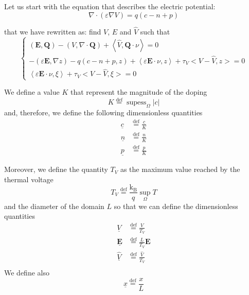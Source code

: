\documentclass[a4paper,12pt, draft]{article}
\newcommand{\Def}{\stackrel{\mathrm{def}}{=}}
\newcommand{\efield}{\ensuremath{\mathbf{E}}}
\newcommand{\qtest}{\ensuremath{\mathbf{Q}}}
\newcommand{\ttest}{\ensuremath{\xi}}
\newcommand{\cmagn}{\ensuremath{K}}
\newcommand{\adim}[1]{\ensuremath{\underline{#1}}}
\begin{document}
Let us start with the equation that describes the electric potential:
\begin{equation*}
 \nabla\cdot\left( \varepsilon \nabla V\right) = q \left( c - n + p \right)
\end{equation*}

that we have rewritten as: find $V$, $E$ and $\widehat{V}$ such that
\begin{equation} \label{eq:poissonwithdim}
 \begin{cases}
  \left(\efield, \qtest \right) - \left(V,\nabla \cdot \qtest\right) +
    \left<\widehat{V}, \qtest \cdot \nu \right>     = 0 \\
  - \left(\varepsilon \efield, \nabla z\right) - q \left(c -n + p,z\right) +
    \left<\varepsilon \efield \cdot \nu, z\right> + \tau_{V} \big<V - \widehat{V}, z \big> = 0 \\
  \left<\varepsilon \efield \cdot \nu, \ttest \right> + \tau_{V} \big<V - \widehat{V}, \ttest \big> 
=0
 \end{cases}
\end{equation}

We define a value $K$ that represent the magnitude of the doping
\begin{equation*}
  \cmagn \Def \operatorname{supess}_\Omega \left| c \right|
\end{equation*}
and, therefore, we define the following dimensionless quantities
\begin{align*}
  \adim{c} & \Def \frac{c}{\cmagn} \\
  \adim{n} & \Def \frac{n}{\cmagn} \\
  \adim{p} & \Def \frac{p}{\cmagn}
\end{align*}

Moreover, we define the quantity $T_{V}$ as the maximum value reached by the thermal voltage
\[
 T_{V} \Def \frac{\mathrm{k}_{\mathrm{B}}}{q} \operatorname{sup}_{\Omega}T
\]
and the diameter of the domain $L$ so that we can define the dimensionless quantities
\begin{align*}
 \adim{V} & \Def \frac{V}{T_{V}} \\
 \adim{\efield} & \Def \frac{L}{T_{V}}\efield \\
 \adim{\widehat{V}} & \Def \frac{\widehat{V}}{T_{V}} \\
\end{align*}
We define also
\begin{equation}\label{eq:adimx} \adim{x} \Def \frac{x}{L} \end{equation}
\end{document}
